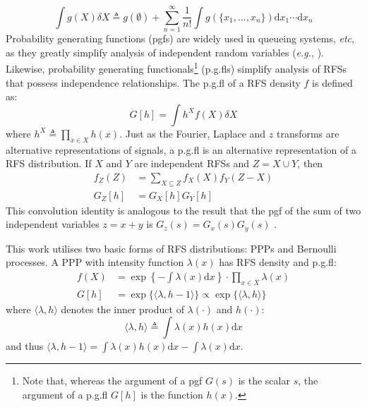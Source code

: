 \documentclass[journal,twoside]{IEEEtran}
\theoremstyle{plain}
\begin{document}
%
\begin{equation}
\int{g(X) \delta X}
\triangleq g(\emptyset) + \sum_{n=1}^{\infty}\frac{1}{n!}\int{g(\{x_1,\dots,x_n\})\mathrm{d} x_1 \cdots \mathrm{d} x_n} \label{eq:SetIntegral}
\end{equation}
Probability generating functions (pgfs) are widely used in queueing systems, \textit{etc}\xspace, as they greatly simplify analysis of independent random variables (\textit{e.g.}\xspace, \cite{GriSti01}). Likewise, probability generating functionals\footnote{Note that, whereas the argument of a pgf $G(s)$ is the scalar $s$, the argument of a p.g.fl $G[h]$ is the function $h(x)$.} (p.g.fls) simplify analysis of RFSs that possess independence relationships. The p.g.fl of a RFS density $f$ is defined as: \cite[p371]{Mah07}
%
\begin{equation}
G[h] = \int{h^X f(X) \delta X}
\end{equation}
%
where $h^X \triangleq \prod_{x\in X}h(x)$. Just as the Fourier, Laplace and $z$ transforms are alternative representations of signals, a p.g.fl is an alternative representation of a RFS distribution. If $X$ and $Y$ are independent RFSs and $Z=X\cup Y$, then \cite[p372,386]{Mah07}
%
\begin{equation}\label{eq:Convolution}
\begin{split}
f_Z(Z) &= \sum_{X\subseteq Z}f_X(X) f_Y(Z-X)  \\
G_Z[h] &= G_X[h] G_Y[h] 
\end{split}
\end{equation}
%
This convolution identity is analogous to the result that the pgf of the sum of two independent variables $z=x+y$ is $G_z(s)=G_x(s) G_y(s)$ \cite[p153]{GriSti01}. 

This work utilises two basic forms of RFS distributions: PPPs and Bernoulli processes. A PPP with intensity function $\lambda(x)$ has RFS density and p.g.fl: \cite[p373]{Mah07}
%
\begin{equation}\label{eq:Poisson}
\begin{split}
f(X) &= \exp\left\{-\int{\lambda(x)\mathrm{d} x}\right\} \cdot \prod_{x\in X} \lambda(x)  \\
G[h] &= \exp\{\langle \lambda,h-1\rangle\} \propto \exp\{\langle \lambda,h\rangle\} 
\end{split}
\end{equation}
%
where $\langle \lambda,h\rangle$ denotes the inner product of $\lambda(\cdot)$ and $h(\cdot)$:
%
\begin{equation}
\langle \lambda,h\rangle \triangleq \int{\lambda(x)h(x)\mathrm{d} x}
\end{equation}
%
and thus $\langle \lambda,h-1\rangle = \int{\lambda(x)h(x)\mathrm{d} x} - \int{\lambda(x)\mathrm{d} x}$.
\end{document}

